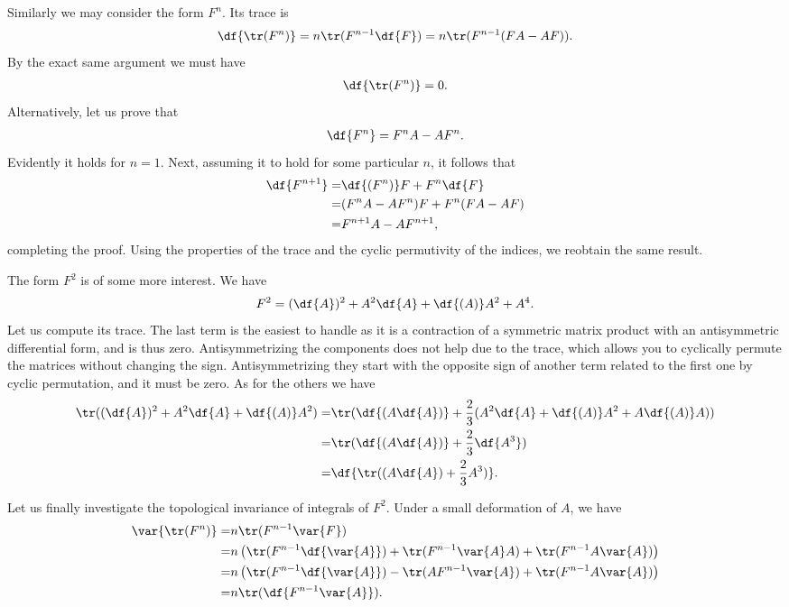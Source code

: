 Similarly we may consider the form $F^{n}$. Its trace is
\begin{align*}
	\df{\tr(F^{n})} = n\tr(F^{n - 1}\df{F}) = n\tr(F^{n - 1}(FA - AF)).
\end{align*}
By the exact same argument we must have
\begin{align*}
	\df{\tr(F^{n})} = 0.
\end{align*}
Alternatively, let us prove that
\begin{align*}
	\df{F^{n}} = F^{n}A - AF^{n}.
\end{align*}
Evidently it holds for $n = 1$. Next, assuming it to hold for some particular $n$, it follows that
\begin{align*}
	\df{F^{n + 1}} =& \df{(F^{n})}F + F^{n}\df{F} \\
	               =& (F^{n}A - AF^{n})F + F^{n}(FA - AF) \\
	               =& F^{n + 1}A - AF^{n + 1},
\end{align*}
completing the proof. Using the properties of the trace and the cyclic permutivity of the indices, we reobtain the same result.

The form $F^{2}$ is of some more interest. We have
\begin{align*}
	F^{2} = (\df{A})^{2} + A^{2}\df{A} + \df{(A)}A^{2} + A^{4}.
\end{align*}
Let us compute its trace. The last term is the easiest to handle as it is a contraction of a symmetric matrix product with an antisymmetric differential form, and is thus zero. Antisymmetrizing the components does not help due to the trace, which allows you to cyclically permute the matrices without changing the sign. Antisymmetrizing they start with the opposite sign of another term related to the first one by cyclic permutation, and it must be zero. As for the others we have
\begin{align*}
	\tr((\df{A})^{2} + A^{2}\df{A} + \df{(A)}A^{2}) =& \tr(\df{(A\df{A})} + \frac{2}{3}(A^{2}\df{A} + \df{(A)}A^{2} + A\df{(A)}A)) \\
	=& \tr(\df{(A\df{A})} + \frac{2}{3}\df{A^{3}}) \\
	=& \df{\tr((A\df{A}) + \frac{2}{3}A^{3})}.
\end{align*}

Let us finally investigate the topological invariance of integrals of $F^{2}$. Under a small deformation of $A$, we have
\begin{align*}
	\var{\tr(F^{n})} =& n\tr(F^{n - 1}\var{F}) \\
	                 =& n\left(\tr(F^{n - 1}\df{\var{A}}) + \tr(F^{n - 1}\var{A}A) + \tr(F^{n - 1}A\var{A})\right) \\
	                 =& n\left(\tr(F^{n - 1}\df{\var{A}}) - \tr(AF^{n - 1}\var{A}) + \tr(F^{n - 1}A\var{A})\right) \\
	                 =& n\tr(\df{F^{n - 1}\var{A}}).
\end{align*}

